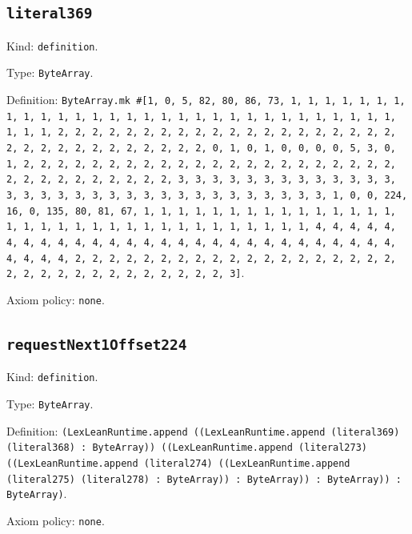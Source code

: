 \documentclass[11pt]{article}
\begin{document}
\subsection*{\texttt{literal369}}
\noindent Kind: \texttt{definition}.\par
\noindent Type: \texttt{ByteArray}.\par
\noindent Definition: \texttt{ByteArray.mk \#[1, 0, 5, 82, 80, 86, 73, 1, 1, 1, 1, 1, 1, 1, 1, 1, 1, 1, 1, 1, 1, 1, 1, 1, 1, 1, 1, 1, 1, 1, 1, 1, 1, 1, 1, 1, 1, 1, 1, 1, 2, 2, 2, 2, 2, 2, 2, 2, 2, 2, 2, 2, 2, 2, 2, 2, 2, 2, 2, 2, 2, 2, 2, 2, 2, 2, 2, 2, 2, 2, 2, 2, 0, 1, 0, 1, 0, 0, 0, 0, 5, 3, 0, 1, 2, 2, 2, 2, 2, 2, 2, 2, 2, 2, 2, 2, 2, 2, 2, 2, 2, 2, 2, 2, 2, 2, 2, 2, 2, 2, 2, 2, 2, 2, 2, 2, 3, 3, 3, 3, 3, 3, 3, 3, 3, 3, 3, 3, 3, 3, 3, 3, 3, 3, 3, 3, 3, 3, 3, 3, 3, 3, 3, 3, 3, 3, 3, 3, 1, 0, 0, 224, 16, 0, 135, 80, 81, 67, 1, 1, 1, 1, 1, 1, 1, 1, 1, 1, 1, 1, 1, 1, 1, 1, 1, 1, 1, 1, 1, 1, 1, 1, 1, 1, 1, 1, 1, 1, 1, 1, 1, 4, 4, 4, 4, 4, 4, 4, 4, 4, 4, 4, 4, 4, 4, 4, 4, 4, 4, 4, 4, 4, 4, 4, 4, 4, 4, 4, 4, 4, 4, 4, 4, 2, 2, 2, 2, 2, 2, 2, 2, 2, 2, 2, 2, 2, 2, 2, 2, 2, 2, 2, 2, 2, 2, 2, 2, 2, 2, 2, 2, 2, 2, 2, 2, 3]}.\par
\noindent Axiom policy: \texttt{none}.\par
\subsection*{\texttt{requestNext1Offset224}}
\noindent Kind: \texttt{definition}.\par
\noindent Type: \texttt{ByteArray}.\par
\noindent Definition: \texttt{(LexLeanRuntime.append ((LexLeanRuntime.append (literal369) (literal368) : ByteArray)) ((LexLeanRuntime.append (literal273) ((LexLeanRuntime.append (literal274) ((LexLeanRuntime.append (literal275) (literal278) : ByteArray)) : ByteArray)) : ByteArray)) : ByteArray)}.\par
\noindent Axiom policy: \texttt{none}.\par
\end{document}
